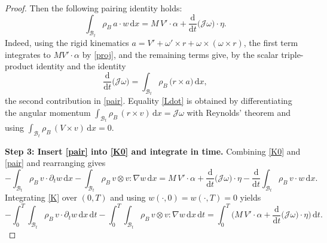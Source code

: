 \documentclass[10pt,a4paper]{amsart}
\begin{document}
\begin{proof}
Then the following pairing identity holds:
\begin{equation}
\int_{\mathcal B_t}\rho_B\,a\cdot w\,\mathrm{d}x
= M\,{V'}\cdot\alpha + \frac{\mathrm{d}}{\mathrm{d}t}\big(\mathcal J\omega\big)\cdot\eta.
\label{pair}
\end{equation}
Indeed, using the rigid kinematics
$a={V'}+{\omega'}\times r+\omega\times(\omega\times r)$,
the first term integrates to $M{V'}\cdot \alpha$ by \eqref{proj}, and the remaining
terms give, by the scalar triple-product identity and the identity
\begin{equation}
\frac{\mathrm{d}}{\mathrm{d}t}\big(\mathcal J\omega\big)
=\int_{\mathcal B_t}\rho_B\,\big(r\times a\big)\,\mathrm{d}x,
\label{Ldot}
\end{equation}
the second contribution in \eqref{pair}. Equality \eqref{Ldot} is obtained by differentiating the
angular momentum $\int_{\mathcal B_t}\rho_B\,( r\times v)\,\mathrm{d}x=\mathcal J\omega$
with Reynolds' theorem and using $\int_{\mathcal B_t}\rho_B\,(V\times v)\,\mathrm{d}x
= 0$.

\noindent\textbf{Step 3: Insert \eqref{pair} into \eqref{K0} and integrate in time.}
Combining \eqref{K0} and \eqref{pair} and rearranging gives
\begin{equation}
-\!\!\int_{\mathcal B_t}\rho_B\, v\cdot\partial_t w\,\mathrm{d}x
-\!\!\int_{\mathcal B_t}\rho_B\, v\otimes v:\nabla w\,\mathrm{d}x
= M\,{V'}\cdot \alpha + \frac{\mathrm{d}}{\mathrm{d}t}\big(\mathcal J\omega\big)\cdot\eta
-\frac{\mathrm{d}}{\mathrm{d}t}\int_{\mathcal B_t}\rho_B\,v\cdot w\,\mathrm{d}x.
\label{K}
\end{equation}
Integrating \eqref{K} over $(0,T)$ and using $w(\cdot,0)=w(\cdot,T) =0$ yields
\begin{equation}
-\!\!\int_0^T\!\!\int_{\mathcal B_t}\rho_B\,v\cdot\partial_tw\,\mathrm{d}x\,\mathrm{d}t
-\!\!\int_0^T\!\!\int_{\mathcal B_t}\rho_B\,v\otimes v:\nabla w\,\mathrm{d}x\,\mathrm{d}t
= \int_0^T \Big(M\,{V'}\cdot \alpha
+\frac{\mathrm{d}}{\mathrm{d}t}\big(\mathcal J\omega\big)\cdot\eta\Big)\,\mathrm{d}t.
\label{weak-left}
\end{equation}


\end{proof}
\end{document}
